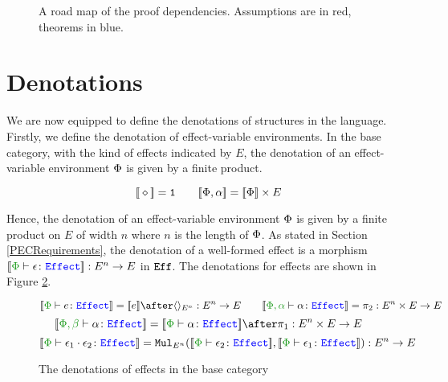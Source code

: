 \documentclass{Report}
\begin{document}
\begin{figure}[H]
\begin{center}
{
    }
    \end{center}
\caption{A road map of the proof dependencies. Assumptions are in red, theorems in blue.}
\label{RoadMap}
\end{figure}


\section{Denotations}\label{PECDenotations}
We are now equipped to define the denotations of structures in the language. Firstly, we define the denotation of effect-variable environments. In the base category, with the kind of effects indicated by $E$, the denotation of an effect-variable environment $\P$ is given by a finite product.

\[
\deno{\nil} = \1 \quad\quad \deno{\P, \a} = \deno{\P}\times E    
\]

Hence, the denotation of an  effect-variable environment $\P$ is given by a finite product on $E$ of width $n$ where $n$ is the length of $\P$. As stated in Section \ref{PECRequirements}, the denotation of a well-formed effect is a morphism $\deno{\typerelation{\P}{\e}{\effect}}: E^n \rightarrow E$ in $\Eff$. The denotations for effects are shown in Figure \ref{EffectDenotations}.
\begin{figure}[H]
    \centering
    \begin{framed}
        \[
    \deno{\typerelation{\P}{e}{\effect}} = \deno{e} \after \term{E^n}: E^n\rightarrow E
    \quad\quad
    \deno{\typerelation{\P,\a}{\a}{\effect}} = \pp: E^n\times E \rightarrow E
\]\[
    \deno{\typerelation{\P, \b}{\a}{\effect}} = \deno{\typerelation{\P}{\a}{\effect}}\after\p: E^n\times E\rightarrow E
\]\[
    \deno{\typerelation{\P}{\e_1\dot \e_2}{\effect}} = \Mul_{E^n}(\deno{\typerelation{\P}{\e_2}{\effect}},\deno{\typerelation{\P}{\e_1}{\effect}}): E^n \rightarrow E
\]
    \end{framed}
    \caption{The denotations of effects in the base category}
    \label{EffectDenotations}
\end{figure}
\end{document}
